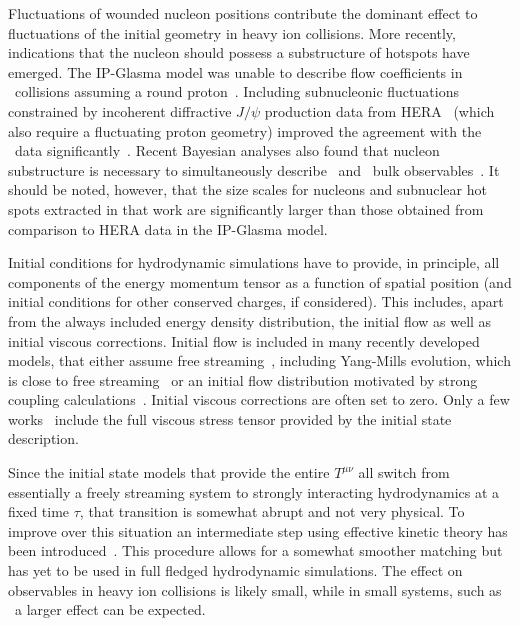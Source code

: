 Fluctuations of wounded nucleon positions contribute the dominant effect to 
  fluctuations of the initial geometry in heavy ion collisions. 
More recently, indications that the nucleon should possess a substructure of hotspots 
  have emerged. 
The IP-Glasma model was unable to describe flow coefficients in \ppb\ 
  collisions assuming a round proton~\cite{Schenke:2014zha}. 
Including subnucleonic fluctuations constrained by incoherent 
  diffractive $J/\psi$ production data from HERA~\cite{Mantysaari:2016ykx} 
  (which also require a fluctuating proton geometry) improved the agreement 
  with the \ppb\ data significantly~\cite{Mantysaari:2017cni}. 
Recent Bayesian analyses also found that nucleon substructure is necessary 
  to simultaneously describe \ppb\ and \pbpb\ bulk observables~\cite{Moreland:2018gsh}.
It should be noted, however, that the size scales for nucleons and subnuclear 
  hot spots extracted in that work are significantly larger than those obtained
  from comparison to HERA data in the IP-Glasma model.

Initial conditions for hydrodynamic simulations have to provide, in principle, 
  all components of the energy momentum tensor as a function of spatial position 
  (and initial conditions for other conserved charges, if considered). 
This includes, apart from the always included energy density distribution, 
  the initial flow as well as initial viscous corrections. 
Initial flow is included in many recently developed models, that either assume 
  free streaming~\cite{Moreland:2018gsh}, including Yang-Mills evolution, which 
  is close to free streaming~\cite{Gale:2012rq} or an initial flow distribution 
  motivated by strong coupling calculations~\cite{Weller:2017tsr}. 
Initial viscous corrections are often set to zero. 
Only a few works~\cite{Mantysaari:2017cni,Schenke:2018fci,Moreland:2018gsh} 
  include the full viscous stress tensor provided by the initial state description.

Since the initial state models that provide the entire $T^{\mu\nu}$ all switch 
  from essentially a freely streaming system to strongly interacting hydrodynamics 
  at a fixed time $\tau$, that transition is somewhat abrupt and not very physical. 
To improve over this situation an intermediate step using effective kinetic theory 
  has been introduced~\cite{Kurkela:2018wud,Kurkela:2018vqr}. 
This procedure allows for a somewhat smoother matching but has yet to be used in 
  full fledged hydrodynamic simulations. 
The effect on observables in heavy ion collisions is likely small, while in small 
  systems, such as \pA\ a larger effect can be expected.

